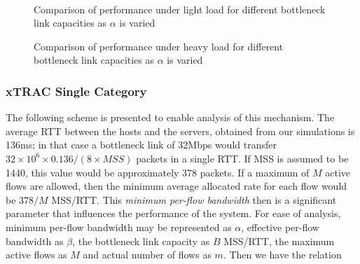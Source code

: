 \documentclass[conference]{../../IEEEtran}
\begin{document}
	\begin{figure*}[hbt]
		\begin{center}
		\hspace{0.5cm}
		\hspace{0.5cm}
			\\
		\caption{Comparison of performance under light load for different bottleneck link capacities as $\alpha$ is varied}
		\label{fig:twoqlperf}
		\end{center}
	\end{figure*}	

	\begin{figure*}[hbt]
		\begin{center}		
		\hspace{0.5cm}
		\hspace{0.5cm}
		\caption{Comparison of performance under heavy load for different bottleneck link capacities as $\alpha$ is varied}
		\label{fig:twoqperf}
		\end{center}
	\end{figure*}
	
\subsubsection{xTRAC Single Category}
The following scheme is presented to enable analysis of this mechanism. The average RTT between the hosts and the servers, obtained from our simulations is 136ms; in that case a bottleneck link of 32Mbps would transfer $32 \times 10^6 \times 0.136/(8 \times MSS)$ packets in a single RTT. If MSS is assumed to be 1440, this value would be approximately 378 packets. If a maximum of $M$ active flows are allowed, then the minimum average allocated rate for each flow would be $378/M$ MSS/RTT. This \emph{minimum per-flow bandwidth} then is a significant parameter that influences the performance of the system. For ease of analysis, minimum per-flow bandwidth may be represented as $\alpha$, effective per-flow bandwidth as $\beta$, the bottleneck link capacity as $B$ MSS/RTT, the maximum active flows as $M$ and actual number of flows as $m$. Then we have the relation
\end{document}
